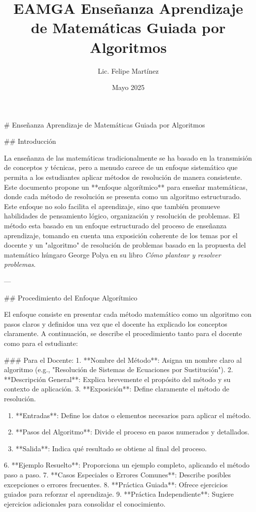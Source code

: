 \documentclass[12pt]{article}
\title{EAMGA Enseñanza Aprendizaje de Matemáticas Guiada por Algoritmos}
\author{Lic. Felipe Martínez}
\date{Mayo 2025}
\begin{document}
\begin{markdown}
\maketitle
# Enseñanza Aprendizaje de Matemáticas Guiada por Algoritmos

## Introducción

La enseñanza de las matemáticas tradicionalmente se ha basado en la transmisión de conceptos y técnicas, pero a menudo carece de un enfoque sistemático que permita a los estudiantes aplicar métodos de resolución de manera consistente. Este documento propone un **enfoque algorítmico** para enseñar matemáticas, donde cada método de resolución se presenta como un algoritmo estructurado. Este enfoque no solo facilita el aprendizaje, sino que también promueve habilidades de pensamiento lógico, organización y resolución de problemas.
El método esta basado en un enfoque estructurado del proceso de enseñanza aprendizaje, tomando en cuenta una exposición coherente de los temas por el docente y un "algoritmo" de resolución de problemas basado en la propuesta del matemático húngaro George Polya en su libro \textit{Cómo plantear y resolver problemas}. 

---

## Procedimiento del Enfoque Algorítmico

El enfoque consiste en presentar cada método matemático como un algoritmo con pasos claros y definidos una vez que el docente ha explicado los conceptos claramente. A continuación, se describe el procedimiento tanto para el docente como para el estudiante:

### Para el Docente:
1. **Nombre del Método**: Asigna un nombre claro al algoritmo (e.g., "Resolución de Sistemas de Ecuaciones por Sustitución").
2. **Descripción General**: Explica brevemente el propósito del método y su contexto de aplicación.
3. **Exposición**: Define claramente el método de resolución.
\begin{enumerate} 
\item **Entradas**: Define los datos o elementos necesarios para aplicar el método.
\item **Pasos del Algoritmo**: Divide el proceso en pasos numerados y detallados.
\item **Salida**: Indica qué resultado se obtiene al final del proceso.    
\end{enumerate}

6. **Ejemplo Resuelto**: Proporciona un ejemplo completo, aplicando el método paso a paso.
7. **Casos Especiales o Errores Comunes**: Describe posibles excepciones o errores frecuentes.
8. **Práctica Guiada**: Ofrece ejercicios guiados para reforzar el aprendizaje.
9. **Práctica Independiente**: Sugiere ejercicios adicionales para consolidar el conocimiento.


\end{markdown}
\end{document}
